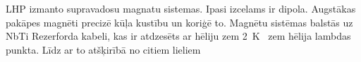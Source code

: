 \documentclass{report}
\begin{document}
LHP izmanto supravadosu magnatu sistemas. Ipasi izcelams ir dipola. Augstākas pakāpes magnēti precizē kūļa kustību un koriģē to. Magnētu sistēmas balstās uz NbTi Rezerforda kabeli, kas ir atdzesēts ar hēliju zem 2~K \textendash\ zem hēlija lambdas punkta. Līdz ar to atšķirībā no citiem lieliem 
\end{document}
